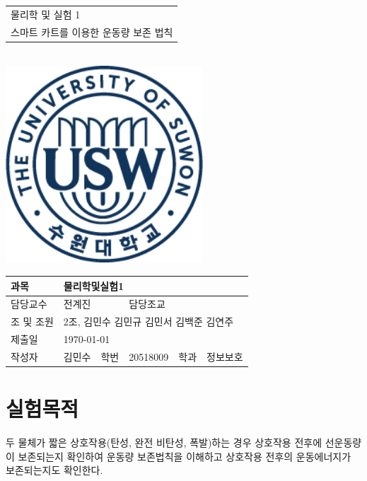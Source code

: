 \documentclass[12pt,a4paper]{article}
\begin{document}
\begin{titlepage}
    \centering
    \begin{tabular}{|C{15cm}|}
        \hline
        \rule{0in}{6ex}
        {\huge 물리학 및 실험 1\par} \\ 
        {\large 스마트 카트를 이용한 운동량 보존 법칙\par} \\
        \hline
    \end{tabular} \\
    \vspace{5cm}
    \includegraphics[height=7.36cm]{logo.png}\par
    \vspace{3cm}
    \begin{tabular}{|l|l|l|l|l|l|}
        \hline
        과목 & \multicolumn{5}{l|}{물리학및실험1} \\
        \hline
        담당교수 & \multicolumn{2}{l|}{전계진} & 담당조교 &
            \multicolumn{2}{l|}{} \\
        \hline
        조 및 조원 &
        \multicolumn{5}{l|}{2조, 김민수 김민규 김민서 김백준 김연주} \\
        \hline
        제출일 & \multicolumn{5}{l|}{\today} \\
        \hline
        작성자 & 김민수 & 학번 & 20518009 & 학과 & 정보보호 \\
        \hline
    \end{tabular}
\end{titlepage}
\section{실험목적}
두 물체가 짧은 상호작용(탄성, 완전 비탄성, 폭발)하는 경우 상호작용 전후에 선운동량이
보존되는지 확인하여 운동량 보존법칙을 이해하고 상호작용 전후의 운동에너지가
보존되는지도 확인한다.
\end{document}
